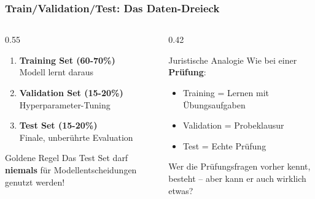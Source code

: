 \documentclass[11pt, aspectratio=169]{beamer}
\begin{document}
\begin{frame}
    \frametitle{Train/Validation/Test: Das Daten-Dreieck}
    \begin{columns}[t]
        \begin{column}{0.55\textwidth}
            \begin{enumerate}
                \item \textbf{Training Set (60-70\%)}\\
                      Modell lernt daraus
                \item \textbf{Validation Set (15-20\%)}\\
                      Hyperparameter-Tuning
                \item \textbf{Test Set (15-20\%)}\\
                      Finale, unberührte Evaluation
            \end{enumerate}
            \vspace{0.3cm}
            \begin{alertblock}{Goldene Regel}
                Das Test Set darf \textbf{niemals} für Modellentscheidungen genutzt werden!
            \end{alertblock}
        \end{column}
        \begin{column}{0.42\textwidth}
            \begin{block}{Juristische Analogie}
                Wie bei einer \textbf{Prüfung}:
                \begin{itemize}
                    \item Training = Lernen mit Übungsaufgaben
                    \item Validation = Probeklausur
                    \item Test = Echte Prüfung
                \end{itemize}
                \vspace{0.2cm}
                Wer die Prüfungsfragen vorher kennt, besteht -- aber kann er auch wirklich etwas?
            \end{block}
        \end{column}
    \end{columns}
\end{frame}
\end{document}
